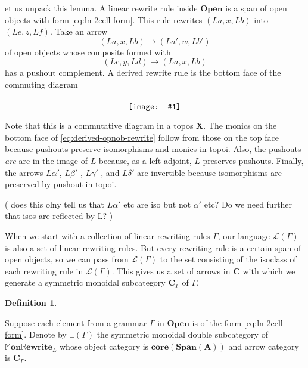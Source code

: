 \documentclass{amsart}
\newcommand{\LL}{\mathbb{L}}
\newcommand{\A}{\cat{A}}
\newcommand{\C}{\cat{C}}
\newcommand{\LinArrCat}{\cat{C}}
\newcommand{\X}{\cat{X}}
\newcommand{\core}{\mathbf{core}}
\newcommand{\cat}[1]{\mathbf{#1}}
\newcommand{\diagram}[1]{\raisebox{-0.5\height}{\texttt{[image: \#1]}}}
\newcommand{\Span}{\mathbf{Span}}
\newcommand{\OpenOb}{\mathbf{Open} }
\newcommand{\MMonRewrite}{ \mathbb{M}\mathbf{on}\mathbb{R}\mathbf{ewrite} }
\newcommand{\edit}[1]{\textcolor{editcolour}{(#1)}}
\newenvironment{exposition}[1]{}{}
\theoremstyle{remark}
\theoremstyle{definition}
\newtheorem{definition}[theorem]{Definition}
\begin{document}
\begin{exposition}

  Let us unpack this lemma.  A linear rewrite rule inside
  \( \OpenOb \) is a span of open objects with form
  \eqref{eq:ln-2cell-form}.  This rule rewrites \( ( La , x , Lb ) \)
  into \( ( Le , z , Lf ) \). Take an arrow
  \[
    ( La , x , Lb ) \to ( La' , w , Lb' )
  \]
  of open objects whose composite formed with
  \[
    ( Lc , y , Ld) \to ( La , x , Lb)
  \]
  has a pushout complement. A derived rewrite rule is the bottom
  face of the commuting diagram
  
  \begin{equation}
    \label{eq:derived-opnob-rewrite}
        \diagram{diag_lr_derived-rewrite-rule}
  \end{equation}

  Note that this is a commutative diagram in a topos \( \X \). The
  monics on the bottom face of \eqref{eq:derived-opnob-rewrite} follow
  from those on the top face because pushouts preserve isomorphisms
  and monics in topoi. Also, the pushouts \emph{are} are in the image
  of \( L \) because, as a left adjoint, \( L \) preserves
  pushouts. Finally, the arrows \( L \alpha' \), \( L \beta' \) ,
  \( L \gamma' \) , and \( L \delta' \) are invertible because
  isomorphisms are preserved by pushout in topoi.

  \edit{ does this olny tell us that $L\alpha'$ etc are iso but not
    $\alpha'$ etc? Do we need further that isos are reflected by L?  }
 
  When we start with a collection of linear rewriting rules
  \( \Gamma \), our language \( \mathcal{ L } ( \Gamma ) \) is also a
  set of linear rewriting rules.  But every rewriting rule is a
  certain span of open objects, so we can pass from
  \( \mathcal{L} ( \Gamma ) \) to the set consisting of the isoclass
  of each rewriting rule in \( \mathcal{L} ( \Gamma ) \). This gives
  us a set of arrows in \( \C \) with which we generate a symmetric
  monoidal subcategory \( \LinArrCat_\Gamma \) of \( \Gamma \).
    
\end{exposition}

\begin{definition} \label{df:gramr-gen-dbl-cat}
	
  Suppose each element from a grammar $ \Gamma $ in $ \OpenOb $ is of
  the form \eqref{eq:ln-2cell-form}.  Denote by $ \LL ( \Gamma ) $ the
  symmetric monoidal double subcategory of $ \MMonRewrite_{L} $ whose
  object category is \( \core ( \Span ( \A ) ) \) and arrow category
  is \( \LinArrCat_\Gamma \).
        
\end{definition}
\end{document}

